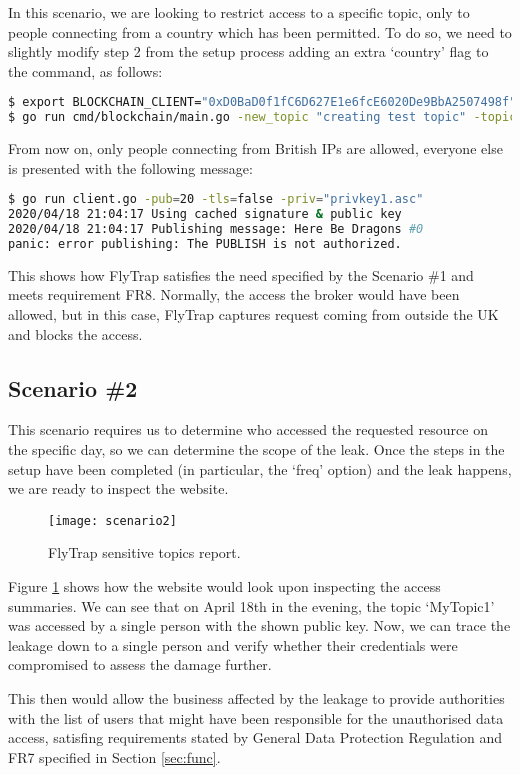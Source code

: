 In this scenario, we are looking to restrict access to a specific topic, only to people connecting from a country which has been permitted. To do so, we need to slightly modify step 2 from the setup process adding an extra `country' flag to the command, as follows:
\begin{lstlisting}[language=bash,breaklines=true]
$ export BLOCKCHAIN_CLIENT="0xD0BaD0f1fC6D627E1e6fcE6020De9BbA2507498f"
$ go run cmd/blockchain/main.go -new_topic "creating test topic" -topic "RestrictedTopic" -country="GB"
\end{lstlisting}
From now on, only people connecting from British IPs are allowed, everyone else is presented with the following message:
\begin{lstlisting}[language=bash,breaklines=true]
$ go run client.go -pub=20 -tls=false -priv="privkey1.asc"
2020/04/18 21:04:17 Using cached signature & public key
2020/04/18 21:04:17 Publishing message: Here Be Dragons #0
panic: error publishing: The PUBLISH is not authorized.
\end{lstlisting}
This shows how FlyTrap satisfies the need specified by the Scenario \#1 and meets requirement FR8. Normally, the access the broker would have been allowed, but in this case, FlyTrap captures request coming from outside the UK and blocks the access.
\subsection{Scenario \#2}
This scenario requires us to determine who accessed the requested resource on the specific day, so we can determine the scope of the leak. Once the steps in the setup have been completed (in particular, the `freq' option) and the leak happens, we are ready to inspect the website.

\begin{figure}[h]
    \centering
    \texttt{[image: scenario2]}
    \caption{FlyTrap sensitive topics report.}
    \label{fig:scenario2}
\end{figure}

Figure \ref{fig:scenario2} shows how the website would look upon inspecting the access summaries. We can see that on April 18th in the evening, the topic `MyTopic1' was accessed by a single person with the shown public key. Now, we can trace the leakage down to a single person and verify whether their credentials were compromised to assess the damage further.

This then would allow the business affected by the leakage to provide authorities with the list of users that might have been responsible for the unauthorised data access, satisfing requirements stated by General Data Protection Regulation and FR7 specified in Section \ref{sec:func}.

